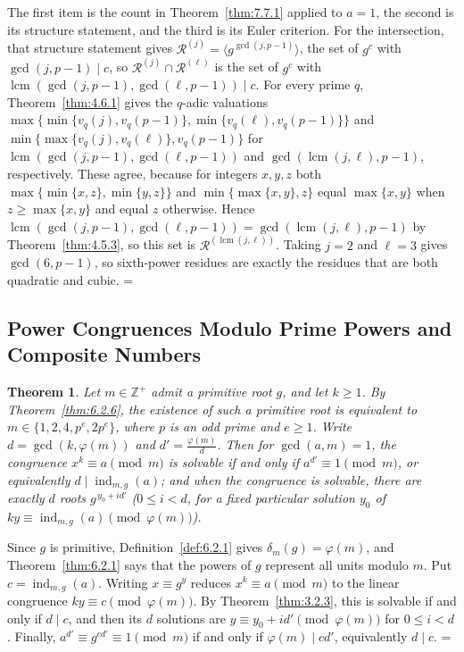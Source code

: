 \documentclass[11pt]{article}
\makeatletter
\theoremstyle{ntstyle}
\newtheorem{theorem}{Theorem}[subsection]
\let\nt@closedisplay\]
\def\nt@guardedclose{\@ifnextchar\par{\nt@closeafterpar}{\@ifnextchar\end{\postdisplaypenalty\@M\nt@closedisplay}{\nt@closedisplay}}}
\def\nt@closeafterpar\par{\@ifnextchar\par{\nt@closeafterpar}{\@ifnextchar\end{\postdisplaypenalty\@M\nt@closedisplay\par}{\nt@closedisplay\par}}}
\renewenvironment{proof}[1][\proofname]{\par
  \pushQED{\qed}\normalfont\topsep\medskipamount\edef\nt@afterproof{\@endparpenalty=\the\@endparpenalty\relax}\@beginparpenalty\@M\@endparpenalty\@M\let\]\nt@guardedclose\trivlist\item[]\textit{#1\@addpunct{.}} \ignorespaces}{\ifvmode\addpenalty\@M\fi\popQED\nt@afterproof\endtrivlist\@endpefalse}
\DeclareMathOperator{\lcm}{lcm}
\DeclareMathOperator{\ind}{ind}
\makeatother
\begin{document}
\begin{proof} The first item is the count in Theorem~\ref{thm:7.7.1}
	applied to $a = 1$, the second is its structure statement, and the third is
	its Euler criterion. For the intersection, that
	structure statement gives $\mathcal{R}^{(j)} = \langle g^{\gcd(j,
				p-1)}\rangle$, the set of $g^{c}$ with $\gcd(j, p-1) \mid c$, so
	$\mathcal{R}^{(j)} \cap \mathcal{R}^{(\ell)}$ is the set of $g^{c}$ with
	$\lcm(\gcd(j, p-1), \gcd(\ell, p-1)) \mid c$. For every prime $q$,
	Theorem~\ref{thm:4.6.1} gives the $q$-adic valuations
	$\max\{\min\{v_q(j),v_q(p-1)\},\min\{v_q(\ell),v_q(p-1)\}\}$ and
	$\min\{\max\{v_q(j),v_q(\ell)\},v_q(p-1)\}$ for $\lcm(\gcd(j, p-1), \gcd(\ell, p-1))$
	and $\gcd(\lcm(j, \ell), p-1)$, respectively. These agree, because for integers
	$x,y,z$ both $\max\{\min\{x,z\},\min\{y,z\}\}$ and $\min\{\max\{x,y\},z\}$ equal
	$\max\{x,y\}$ when $z\ge\max\{x,y\}$ and equal $z$ otherwise. Hence
	$\lcm(\gcd(j, p-1), \gcd(\ell, p-1)) =
		\gcd(\lcm(j, \ell), p-1)$ by Theorem~\ref{thm:4.5.3}, so this set is
	$\mathcal{R}^{(\lcm(j, \ell))}$. Taking $j = 2$ and $\ell = 3$
	gives $\gcd(6, p-1)$, so sixth-power residues are exactly the residues
	that are both quadratic and cubic.
\end{proof}
\subsection{Power Congruences Modulo Prime Powers and Composite Numbers}

\begin{theorem}\label{thm:7.8.1} Let $m\in\mathbb{Z}^+$ admit a primitive root
	$g$, and let $k\ge1$. By Theorem~\ref{thm:6.2.6}, the existence of such a primitive root is equivalent to
	$m\in\{1,2,4,p^e,2p^e\}$, where $p$ is an odd prime and $e\ge1$.
	Write $d = \gcd(k, \varphi(m))$ and
	$d' = \tfrac{\varphi(m)}{d}$. Then
	for $\gcd(a,m)=1$, the congruence $x^k\equiv a\pmod{m}$ is solvable
	if and only if $a^{d'} \equiv 1\pmod{m}$, or equivalently $d \mid \ind_{m,g}(a)$; and when
	the congruence is solvable, there
	are exactly $d$ roots $g^{\,y_0 + id'}$ ($0 \le i < d$, for a fixed
	particular solution $y_0$ of $ky\equiv\ind_{m,g}(a)\pmod{\varphi(m)}$).
\end{theorem}

\begin{proof} Since $g$ is primitive, Definition~\ref{def:6.2.1}
	gives $\delta_m(g)=\varphi(m)$, and Theorem~\ref{thm:6.2.1} says that the powers
	of $g$ represent all units modulo $m$. Put
	$c=\ind_{m,g}(a)$. Writing $x\equiv g^y$ reduces
	$x^k\equiv a\pmod{m}$ to the linear congruence
	$ky\equiv c\pmod{\varphi(m)}$. By Theorem~\ref{thm:3.2.3}, this is solvable if
	and only if $d\mid c$, and then its $d$ solutions are
	$y\equiv y_0+id'\pmod{\varphi(m)}$ for $0\le i<d$. Finally,
	$a^{d'}\equiv g^{cd'}\equiv1\pmod{m}$ if and only if
	$\varphi(m)\mid cd'$, equivalently $d\mid c$.
\end{proof}
\end{document}
